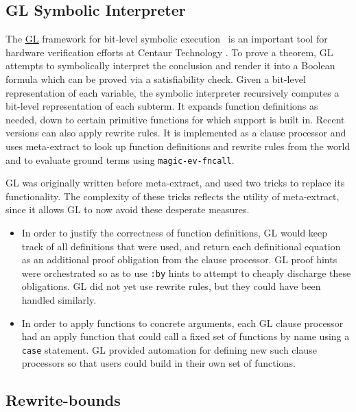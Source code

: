 \subsection{GL Symbolic Interpreter}

The
\href{http://www.cs.utexas.edu/users/moore/acl2/manuals/current/manual/index.html?topic=ACL2\_\_\_\_GL}{\underline{GL}}
framework for bit-level symbolic execution~\cite{gl-diss,
  bit-blasting-GL} is an important tool for hardware verification
efforts at Centaur Technology \cite{centaur-framework}.  To prove a
theorem, GL attempts to symbolically interpret the conclusion and
render it into a Boolean formula which can be proved via a
satisfiability check.  Given a bit-level representation of each
variable, the symbolic interpreter recursively computes a bit-level representation
of each subterm.  It expands function definitions as needed, down to
certain primitive functions for which support is built in.  Recent
versions can also apply rewrite rules.  It is implemented as a clause
processor and uses meta-extract to look up function definitions and
rewrite rules from the world and to evaluate ground terms using
\texttt{magic-ev-fncall}.

GL was originally written before meta-extract, and used two tricks to
replace its functionality.  The complexity of these tricks reflects
the utility of meta-extract, since it allows GL to now avoid these
desperate measures.
\begin{itemize}
\item In order to justify the correctness of function definitions, GL
  would keep track of all definitions that were used, and return each
  definitional equation as an additional proof obligation from the
  clause processor.  GL proof hints were orchestrated so as to use
  \texttt{:by} hints to attempt to cheaply discharge these
  obligations.  GL did not yet use rewrite rules, but they could have
  been handled similarly.
\item In order to apply functions to concrete arguments, each GL
  clause processor had an apply function that could call a fixed set
  of functions by name using a \texttt{case} statement.  GL provided
  automation for defining new such clause processors so that users
  could build in their own set of functions.
\end{itemize}


\subsection{Rewrite-bounds}

